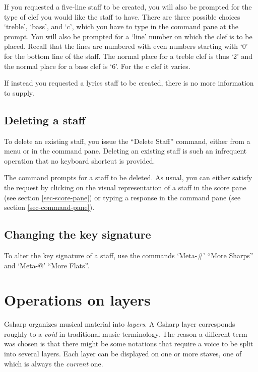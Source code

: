 \documentclass[11pt]{book}
\def\gs{Gsharp}
\def\kbd#1{`#1'}
\def\command#1{``#1''}
\begin{document}
If you requested a five-line staff to be created, you will also be
prompted for the type of clef you would like the staff to have.  There
are three possible choices `treble', `bass', and `c', which you have
to type in the command pane at the prompt.  You will also be prompted
for a `line' number on which the clef is to be placed.  Recall that
the lines are numbered with even numbers starting with `0' for the
bottom line of the staff.  The normal place for a treble clef is thus
`2' and the normal place for a bass clef is `6'.  For the c clef it
varies. 

If instead you requested a lyrics staff to be created, there is no
more information to supply.

\section{Deleting a staff}

To delete an existing staff, you issue the \command{Delete Staff}
command, either from a menu or in the command pane.  Deleting an
existing staff is such an infrequent operation that no keyboard
shortcut is provided. 

The command prompts for a staff to be deleted.  As usual, you can
either satisfy the request by clicking on the visual representation of
a staff in the score pane (see section \ref{sec-score-pane}) or typing
a response in the command pane (see section \ref{sec-command-pane}). 

\section{Changing the key signature}

To alter the key signature of a staff, use the commands \kbd{Meta-\#}
\command{More Sharps} and \kbd{Meta-@} \command{More Flats}. 

\chapter{Operations on layers}

{\gs} organizes musical material into \emph{layers}.  A
{\gs} layer corresponds roughly to a \emph{void} in
traditional music terminology.  The reason a different term was chosen
is that there might be some notations that require a voice to be split
into several layers.  Each layer can be displayed on one or more
staves, one of which is always the \emph{current}
one. 
\end{document}
